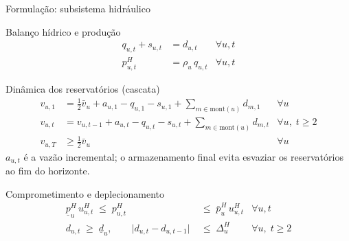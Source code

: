 \documentclass[10pt,aspectratio=169]{beamer}
\newcommand{\pH}{p^{H}}                %
\newcommand{\uH}{u^{H}}                %
\newcommand{\displaycompacto}{%
  \setlength{\abovedisplayskip}{1pt}%
  \setlength{\belowdisplayskip}{1pt}%
  \setlength{\abovedisplayshortskip}{1pt}%
  \setlength{\belowdisplayshortskip}{1pt}%
}
\begin{document}
\begin{frame}{Formulação: subsistema hidráulico}
  \small
  \displaycompacto
  \begin{block}{Balanço hídrico e produção}
    \begin{align*}
      q_{u,t} + s_{u,t} &= d_{u,t}                 & \forall u,t \\
      \pH_{u,t}         &= \rho_u \, q_{u,t}       & \forall u,t
    \end{align*}
  \end{block}

  \begin{block}{Dinâmica dos reservatórios (cascata)}
    \begin{align*}
      v_{u,1} &= \tfrac{1}{2}\bar v_u + a_{u,1} - q_{u,1} - s_{u,1}
                 + \textstyle\sum_{m \in \text{mont}(u)} d_{m,1} & \forall u \\
      v_{u,t} &= v_{u,t-1} + a_{u,t} - q_{u,t} - s_{u,t}
                 + \textstyle\sum_{m \in \text{mont}(u)} d_{m,t} & \forall u,\; t \ge 2 \\
      v_{u,T} &\ge \tfrac{1}{2}\bar v_u                          & \forall u
    \end{align*}
    \footnotesize
    $a_{u,t}$ é a vazão incremental; o armazenamento final evita esvaziar
    os reservatórios ao fim do horizonte.
  \end{block}

  \begin{block}{Comprometimento e deplecionamento}
    \begin{align*}
      \underline{p}^H_u \, \uH_{u,t} \;\le\; \pH_{u,t} &\;\le\; \bar p^H_u \, \uH_{u,t}
        & \forall u,t \\
      d_{u,t} \;\ge\; \underline{d}_u, \qquad
      \bigl| d_{u,t} - d_{u,t-1} \bigr| &\;\le\; \Delta^H_u
        & \forall u,\; t \ge 2
    \end{align*}
  \end{block}
\end{frame}
\end{document}
